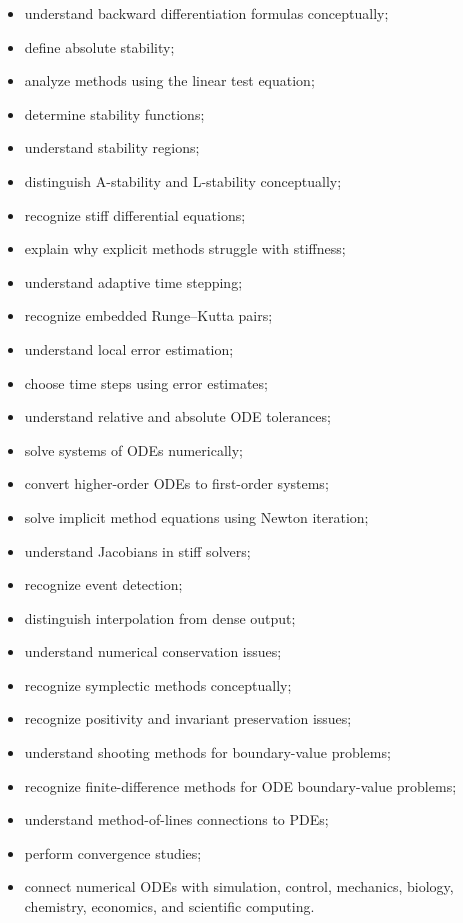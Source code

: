 {\begin{itemize}
    \item understand backward differentiation formulas conceptually;
    \item define absolute stability;
    \item analyze methods using the linear test equation;
    \item determine stability functions;
    \item understand stability regions;
    \item distinguish A-stability and L-stability conceptually;
    \item recognize stiff differential equations;
    \item explain why explicit methods struggle with stiffness;
    \item understand adaptive time stepping;
    \item recognize embedded Runge--Kutta pairs;
    \item understand local error estimation;
    \item choose time steps using error estimates;
    \item understand relative and absolute ODE tolerances;
    \item solve systems of ODEs numerically;
    \item convert higher-order ODEs to first-order systems;
    \item solve implicit method equations using Newton iteration;
    \item understand Jacobians in stiff solvers;
    \item recognize event detection;
    \item distinguish interpolation from dense output;
    \item understand numerical conservation issues;
    \item recognize symplectic methods conceptually;
    \item recognize positivity and invariant preservation issues;
    \item understand shooting methods for boundary-value problems;
    \item recognize finite-difference methods for ODE boundary-value problems;
    \item understand method-of-lines connections to PDEs;
    \item perform convergence studies;
    \item connect numerical ODEs with simulation, control, mechanics,
          biology, chemistry, economics, and scientific computing.
\end{itemize}
}

